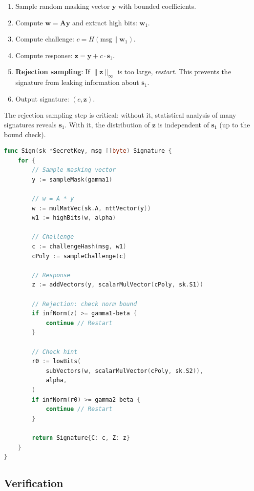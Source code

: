 \documentclass[11pt,a4paper]{article}
\begin{document}
\begin{enumerate}[nosep]
  \item Sample random masking vector $\mathbf{y}$ with bounded coefficients.
  \item Compute $\mathbf{w} = \mathbf{A}\mathbf{y}$ and extract high bits: $\mathbf{w}_1$.
  \item Compute challenge: $c = H(\text{msg} \| \mathbf{w}_1)$.
  \item Compute response: $\mathbf{z} = \mathbf{y} + c \cdot \mathbf{s}_1$.
  \item \textbf{Rejection sampling}: If $\|\mathbf{z}\|_\infty$ is too large, \emph{restart}.
    This prevents the signature from leaking information about $\mathbf{s}_1$.
  \item Output signature: $(c, \mathbf{z})$.
\end{enumerate}

The rejection sampling step is critical: without it, statistical analysis of many
signatures reveals $\mathbf{s}_1$. With it, the distribution of $\mathbf{z}$ is
independent of $\mathbf{s}_1$ (up to the bound check).

\begin{lstlisting}[language=Go,caption={ML-DSA signing with rejection sampling}]
func Sign(sk *SecretKey, msg []byte) Signature {
    for {
        // Sample masking vector
        y := sampleMask(gamma1)

        // w = A * y
        w := mulMatVec(sk.A, nttVector(y))
        w1 := highBits(w, alpha)

        // Challenge
        c := challengeHash(msg, w1)
        cPoly := sampleChallenge(c)

        // Response
        z := addVectors(y, scalarMulVector(cPoly, sk.S1))

        // Rejection: check norm bound
        if infNorm(z) >= gamma1-beta {
            continue // Restart
        }

        // Check hint
        r0 := lowBits(
            subVectors(w, scalarMulVector(cPoly, sk.S2)),
            alpha,
        )
        if infNorm(r0) >= gamma2-beta {
            continue // Restart
        }

        return Signature{C: c, Z: z}
    }
}
\end{lstlisting}

\subsection{Verification}
\end{document}
